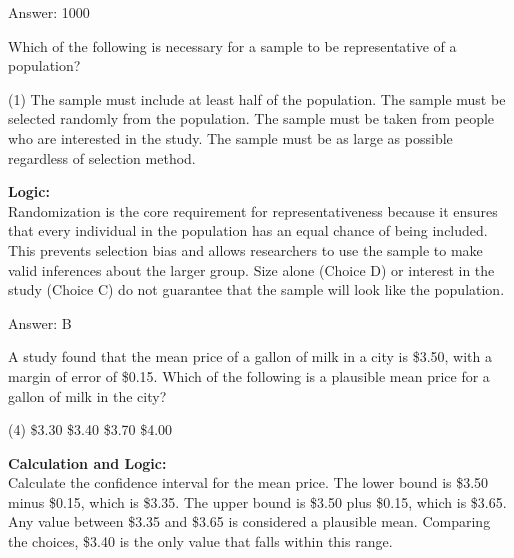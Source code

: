 \documentclass[11pt,paper=a4,answers]{exam}
\begin{document}
\begin{questions}
\begin{solution}
\vspace{30pt}

Answer: \colorbox{yellow!100}{1000}
\end{solution}

\vspace{60pt}

\question
Which of the following is necessary for a sample to be representative of a population?
\begin{tasks}(1)
    \task The sample must include at least half of the population.
    \task The sample must be selected randomly from the population.
    \task The sample must be taken from people who are interested in the study.
    \task The sample must be as large as possible regardless of selection method.
\end{tasks}

\begin{solution}
\textbf{Logic:} \\
Randomization is the core requirement for representativeness because it ensures that every individual in the population has an equal chance of being included. This prevents selection bias and allows researchers to use the sample to make valid inferences about the larger group. Size alone (Choice D) or interest in the study (Choice C) do not guarantee that the sample will look like the population.

\vspace{30pt}

Answer: \colorbox{yellow!100}{B}
\end{solution}

\vspace{60pt}

\question
A study found that the mean price of a gallon of milk in a city is \$3.50, with a margin of error of \$0.15. Which of the following is a plausible mean price for a gallon of milk in the city?
\begin{tasks}(4)
    \task \$3.30
    \task \$3.40
    \task \$3.70
    \task \$4.00
\end{tasks}

\begin{solution}
\textbf{Calculation and Logic:} \\
Calculate the confidence interval for the mean price. The lower bound is \$3.50 minus \$0.15, which is \$3.35. The upper bound is \$3.50 plus \$0.15, which is \$3.65. Any value between \$3.35 and \$3.65 is considered a plausible mean. Comparing the choices, \$3.40 is the only value that falls within this range.


\end{solution}
\end{questions}
\end{document}
